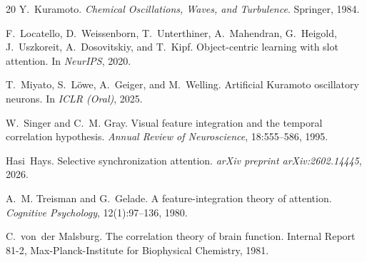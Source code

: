 \documentclass[11pt]{article}
\begin{document}
\begin{thebibliography}{20}
Y.~Kuramoto.
\newblock \emph{Chemical Oscillations, Waves, and Turbulence}.
\newblock Springer, 1984.

F.~Locatello, D.~Weissenborn, T.~Unterthiner, A.~Mahendran,
G.~Heigold, J.~Uszkoreit, A.~Dosovitskiy, and T.~Kipf.
\newblock Object-centric learning with slot attention.
\newblock In \emph{NeurIPS}, 2020.

T.~Miyato, S.~L\"owe, A.~Geiger, and M.~Welling.
\newblock Artificial {K}uramoto oscillatory neurons.
\newblock In \emph{ICLR (Oral)}, 2025.

W.~Singer and C.~M. Gray.
\newblock Visual feature integration and the temporal correlation
  hypothesis.
\newblock \emph{Annual Review of Neuroscience}, 18:555--586, 1995.

Hasi~Hays.
\newblock Selective synchronization attention.
\newblock \emph{arXiv preprint arXiv:2602.14445}, 2026.

A.~M. Treisman and G.~Gelade.
\newblock A feature-integration theory of attention.
\newblock \emph{Cognitive Psychology}, 12(1):97--136, 1980.

C.~von~der Malsburg.
\newblock The correlation theory of brain function.
\newblock Internal Report 81-2, Max-Planck-Institute for Biophysical
  Chemistry, 1981.

\end{thebibliography}
\end{document}

